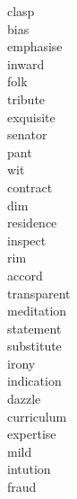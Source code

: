 \documentclass[a4paper, 10pt]{ctexart}
\begin{document}
\begin{multicols*}{2}
\begin{description}
\item[clasp]

\item[bias]

\item[emphasise]

\item[inward]

\item[folk]

\item[tribute]

\item[exquisite]

\item[senator]

\item[pant]

\item[wit]

\item[contract]

\item[dim]

\item[residence]

\item[inspect]

\item[rim]

\item[accord]

\item[transparent]

\item[meditation]

\item[statement]

\item[substitute]

\item[irony]

\item[indication]

\item[dazzle]

\item[curriculum]

\item[expertise]

\item[mild]

\item[intution]

\item[fraud]


\end{description}
\end{multicols*}
\end{document}
